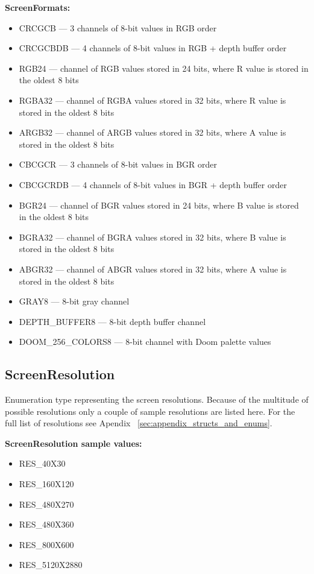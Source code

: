 \documentclass[english,bachelor,a4paper,twoside]{ppfcmthesis}
\begin{document}
\vspace{20pt}
\textbf{ScreenFormats:}
\begin{itemize}
 \item CRCGCB --- 3 channels of 8-bit values in RGB order
 \item CRCGCBDB --- 4 channels of 8-bit values in RGB + depth buffer order
 \item RGB24 --- channel of RGB values stored in 24 bits, where R value is stored in the oldest 8 bits
 \item RGBA32 --- channel of RGBA values stored in 32 bits, where R value is stored in the oldest 8 bits
 \item ARGB32 --- channel of ARGB values stored in 32 bits, where A value is stored in the oldest 8 bits
 \item CBCGCR --- 3 channels of 8-bit values in BGR order
 \item CBCGCRDB --- 4 channels of 8-bit values in BGR + depth buffer order
 \item BGR24 --- channel of BGR values stored in 24 bits, where B value is stored in the oldest 8 bits
 \item BGRA32 --- channel of BGRA values stored in 32 bits, where B value is stored in the oldest 8 bits 
 \item ABGR32 --- channel of ABGR values stored in 32 bits, where A value is stored in the oldest 8 bits
 \item GRAY8 --- 8-bit gray channel
 \item DEPTH\_BUFFER8 --- 8-bit depth buffer channel
 \item DOOM\_256\_COLORS8 --- 8-bit channel with Doom palette values
\end{itemize}
\subsection{ScreenResolution} \label{subsec:screenresolution}

	Enumeration type representing the screen resolutions. Because of the multitude of possible resolutions only a couple of sample resolutions are listed here. For the full list of resolutions see Apendix ~\ref{sec:appendix_structs_and_enums}.


\vspace{20pt}
\textbf{ScreenResolution sample values:}
\begin{itemize}
\item RES\_40X30
\item RES\_160X120	
\item RES\_480X270	
\item RES\_480X360	
\item RES\_800X600
\item RES\_5120X2880
\end{itemize}
\end{document}
